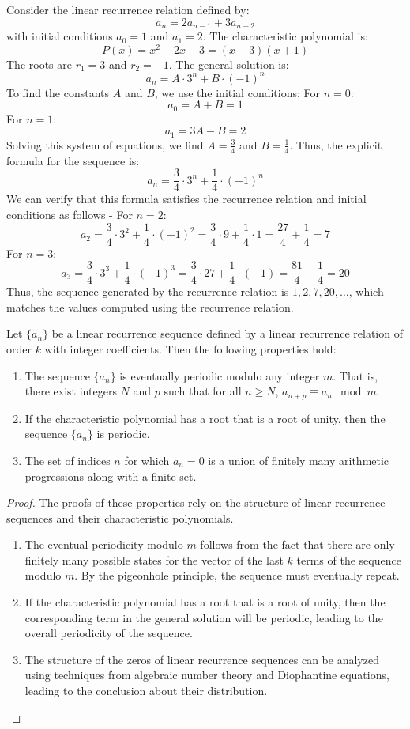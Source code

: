 \documentclass[openany]{book}
\begin{document}
\begin{example}
Consider the linear recurrence relation defined by:
\[a_n = 2a_{n-1} + 3a_{n-2}\]
with initial conditions $a_0 = 1$ and $a_1 = 2$. The characteristic polynomial is:
\[P(x) = x^2 - 2x - 3 = (x -3)(x + 1)\]
The roots are $r_1 = 3$ and $r_2 = -1$. The general solution is:
\[a_n = A \cdot 3^n + B \cdot (-1)^n\]
To find the constants $A$ and $B$, we use the initial conditions:
For $n=0$:
\[a_0 = A + B = 1\]
For $n=1$:
\[a_1 = 3A - B = 2\]
Solving this system of equations, we find $A = \frac{3}{4}$ and $B = \frac{1}{4}$. Thus, the explicit formula for the sequence is:
\[a_n = \frac{3}{4} \cdot 3^n + \frac{1}{4} \cdot (-1)^n\]
We can verify that this formula satisfies the recurrence relation and initial conditions as follows - 
For $n=2$:
\[a_2 = \frac{3}{4} \cdot 3^2 + \frac{1}{4} \cdot (-1)^2 = \frac{3}{4} \cdot 9 + \frac{1}{4} \cdot 1 = \frac{27}{4} + \frac{1}{4} = 7\]
For $n=3$:
\[a_3 = \frac{3}{4} \cdot 3^3 + \frac{1}{4} \cdot (-1)^3 = \frac{3}{4} \cdot 27 + \frac{1}{4} \cdot (-1) = \frac{81}{4} - \frac{1}{4} = 20\]
Thus, the sequence generated by the recurrence relation is $1, 2, 7, 20, \ldots$, which matches the values computed using the recurrence relation.
\end{example}
\begin{mytheorem}
Let $\{a_n\}$ be a linear recurrence sequence defined by a linear recurrence relation of order $k$ with integer coefficients. Then the following properties hold:
\begin{enumerate}
    \item The sequence $\{a_n\}$ is eventually periodic modulo any integer $m$. That is, there exist integers $N$ and $p$ such that for all $n \geq N$, $a_{n+p} \equiv a_n \mod m$.
    \item If the characteristic polynomial has a root that is a root of unity, then the sequence $\{a_n\}$ is periodic.
    \item The set of indices $n$ for which $a_n = 0$ is a union of finitely many arithmetic progressions along with a finite set.
\end{enumerate}
\end{mytheorem}
\begin{proof}
The proofs of these properties rely on the structure of linear recurrence sequences and their characteristic polynomials.
\begin{enumerate}
    \item The eventual periodicity modulo $m$ follows from the fact that there are only finitely many possible states for the vector of the last $k$ terms of the sequence modulo $m$. By the pigeonhole principle, the sequence must eventually repeat.
    \item If the characteristic polynomial has a root that is a root of unity, then the corresponding term in the general solution will be periodic, leading to the overall periodicity of the sequence.
    \item The structure of the zeros of linear recurrence sequences can be analyzed using techniques from algebraic number theory and Diophantine equations, leading to the conclusion about their distribution.
\end{enumerate}
\end{proof}
\end{document}
